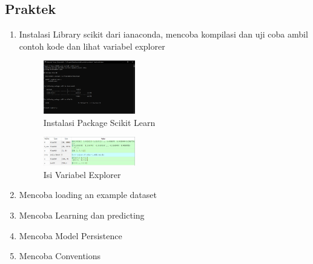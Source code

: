 \subsection{Praktek}
\begin{enumerate}
	\item Instalasi Library scikit dari ianaconda, mencoba kompilasi dan uji coba ambil contoh kode dan lihat variabel explorer
	\hfill\break
	\begin{figure}[H]
		\includegraphics[width=4cm]{figures/1174070/1/1.PNG}
		\centering
		\caption{Instalasi Package Scikit Learn}
	\end{figure}
	\begin{figure}[H]
		\includegraphics[width=4cm]{figures/1174070/1/2.PNG}
		\centering
		\caption{Isi Variabel Explorer}
	\end{figure}
	\item Mencoba loading an example dataset
	\hfill\break
	
	\item Mencoba Learning dan predicting
	\hfill\break
	
	\item Mencoba Model Persistence
	\hfill\break
	
	\item Mencoba Conventions
	\hfill\break
	
\end{enumerate}
